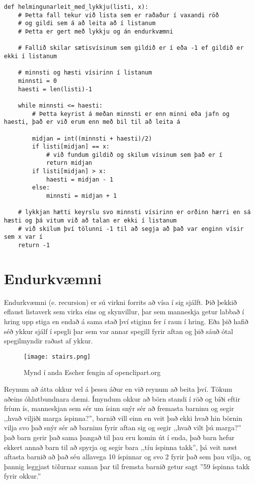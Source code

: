 \begin{lstlisting}[caption=Helmingunarleit að tölu í röðuðum lista með lykkju, label=lst:reiknirit-helm-for]
	def helmingunarleit_med_lykkju(listi, x):
	# Þetta fall tekur við lista sem er raðaður í vaxandi röð
	# og gildi sem á að leita að í listanum
	# Þetta er gert með lykkju og án endurkvæmni
	
	# Fallið skilar sætisvísinum sem gildið er í eða -1 ef gildið er ekki í listanum
	
	# minnsti og hæsti vísirinn í listanum
	minnsti = 0
	haesti = len(listi)-1
	
	while minnsti <= haesti:
		# Þetta keyrist á meðan minnsti er enn minni eða jafn og haesti, það er við erum enn með bil til að leita á
	
		midjan = int((minnsti + haesti)/2)
		if listi[midjan] == x:
			# við fundum gildið og skilum vísinum sem það er í
			return midjan
		if listi[midjan] > x:
			haesti = midjan - 1
		else:
			minnsti = midjan + 1
	
	# lykkjan hætti keyrslu svo minnsti vísirinn er orðinn hærri en sá hæsti og þá vitum við að talan er ekki í listanum 
	# við skilum því tölunni -1 til að segja að það var enginn vísir sem x var í
	return -1
\end{lstlisting}

\section{Endurkvæmni}\label{uk:reiknirit-endurkvæmni}
Endurkvæmni (e. recursion) er sú virkni forrits að vísa í sig sjálft.
Þið þekkið eflaust listaverk sem virka eins og skynvillur, þar sem manneskja getur labbað í hring upp stiga en endað á sama stað því stiginn fer í raun í hring. 
Eða þið hafið séð ykkur sjálf í spegli þar sem var annar spegill fyrir aftan og þið sáuð ótal spegilmyndir raðast af ykkur.
\begin{figure}[h]
	\centering
	\texttt{[image: stairs.png]}
	\caption{Mynd í anda Escher fengin af openclipart.org}
	\label{fig: Escher}
\end{figure}

Reynum að átta okkur vel á þessu áður en við reynum að beita því.
Tökum aðeins óhlutbundnara dæmi.
Ímyndum okkur að börn standi í röð og bíði eftir fríum ís, manneskjan sem sér um ísinn snýr sér að fremasta barninu og segir ,,hvað viljiði marga íspinna?'', barnið vill einn en veit það ekki hvað hin börnin vilja svo það snýr sér að barninu fyrir aftan sig og segir ,,hvað vilt þú marga?'' það barn gerir það sama þangað til þau eru komin út í enda, það barn hefur ekkert annað barn til að spyrja og segir bara ,,tíu íspinna takk'', þá veit næst aftasta barnið að það séu allavega 10 íspinnar og svo 2 fyrir það sem þau vilja, og þannig leggjast tölurnar saman þar til fremsta barnið getur sagt ''59 íspinna takk fyrir okkur.''

